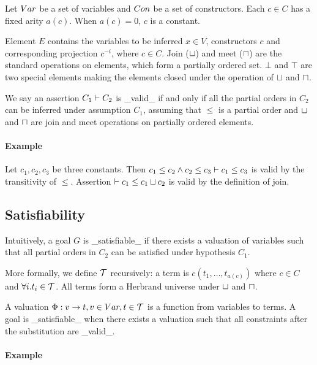 Let $Var$ be a set of variables and $Con$ be a set of constructors.
Each $c\in C$ has a fixed arity $a(c)$. When $a(c)=0$, $c$ is a constant.

Element $E$ contains the variables to be inferred $x\in V$,
constructors $c$ and corresponding projection $c^{-i}$, where $c\in
C$. Join ($\sqcup$) and meet ($\sqcap$) are the standard operations on
elements, which form a partially ordered set. $\bot$ and $\top$ are
two special elements making the elements closed under the operation of
$\sqcup$ and $\sqcap$.


We say an assertion $C_1 \vdash C_2$ is _valid_ if and only if all
the partial orders in $C_2$ can be inferred under assumption $C_1$,
assuming that $\leq$ is a partial order and $\sqcup$ and $\sqcap$ are
join and meet operations on partially ordered elements.

\paragraph{Example}

Let $c_1, c_2, c_3$ be three constants. Then $c_1 \leq c_2 \land c_2 \leq c_3
\vdash c_1 \leq c_3$ is valid by the transitivity of $\leq$. Assertion $
\vdash c_1 \leq c_1 \sqcup c_2$ is valid by the definition of join. 

\subsection{Satisfiability}

Intuitively, a goal $G$ is _satisfiable_ if there exists a valuation of
variables such that all partial orders in $C_2$ can be satisfied under
hypothesis $C_1$.

More formally, we define $\mathcal{T}$ recursively: a term is $c(t_1,
\dots, t_{a(c)})$ where $c\in C$ and $\forall i. t_i\in \mathcal{T}$. All
terms form a Herbrand universe under $\sqcup$ and $\sqcap$.

A valuation $\Phi: v \to t, v\in Var, t\in \mathcal{T}$ is a
function from variables to terms. A goal is _satisfiable_ when there
exists a valuation such that all constraints after the substitution
are _valid_. 

\paragraph{Example}


